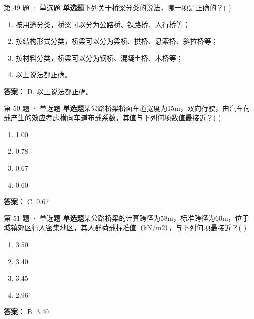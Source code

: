 \documentclass[UTF8,zihao=-4,openany]{ctexbook}
\newenvironment{choices}{\begin{enumerate}[label=\Alph*.,leftmargin=9mm,labelsep=3mm,itemsep=2pt,topsep=4pt]}{\end{enumerate}}
\newcommand{\qtype}[1]{\textcolor{brand}{\sffamily\bfseries #1}}
\begin{document}
\begin{questionbox}{第 49 题 · 单选题}
\qtype{单选题}\quad 下列关于桥梁分类的说法，哪一项是正确的？( )
\begin{choices}
\item 按用途分类，桥梁可以分为公路桥、铁路桥、人行桥等；
\item 按结构形式分类，桥梁可以分为梁桥、拱桥、悬索桥、斜拉桥等；
\item 按材料分类，桥梁可以分为钢桥、混凝土桥、木桥等；
\item 以上说法都正确。
\end{choices}
\begin{answerbox}
\textbf{答案：} D. 以上说法都正确。
\end{answerbox}
\end{questionbox}

\begin{questionbox}{第 50 题 · 单选题}
\qtype{单选题}\quad 某公路桥梁桥面车道宽度为15m，双向行驶，由汽车荷载产生的效应考虑横向车道布载系数，其值与下列何项数值最接近？( )
\begin{choices}
\item 1.00
\item 0.78
\item 0.67
\item 0.60
\end{choices}
\begin{answerbox}
\textbf{答案：} C. 0.67
\end{answerbox}
\end{questionbox}

\begin{questionbox}{第 51 题 · 单选题}
\qtype{单选题}\quad 某公路桥梁的计算跨径为58m，标准跨径为60m，位于城镇郊区行人密集地区，其人群荷载标准值（kN/m2），与下列何项最接近？( )
\begin{choices}
\item 3.50
\item 3.40
\item 3.45
\item 2.96
\end{choices}
\begin{answerbox}
\textbf{答案：} B. 3.40
\end{answerbox}
\end{questionbox}
\end{document}
